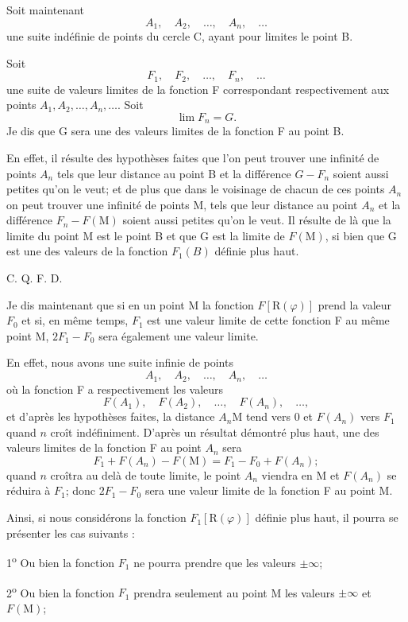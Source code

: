 \documentclass[11pt]{article}
\begin{document}
Soit maintenant
\[
A_1,
\quad A_2,
\quad \ldots,
\quad A_n,
\quad \ldots
\]
une suite indéfinie de points du cercle C, ayant pour limites le point B.

Soit
\[
F_1,
\quad F_2,
\quad \ldots,
\quad F_n,
\quad \ldots
\]
une suite de valeurs limites de la fonction F correspondant respectivement aux points $A_1,A_2,\ldots,A_n,\ldots$. Soit
\[
\lim F_n=G.
\]
Je dis que G sera une des valeurs limites de la fonction F au point B.

En effet, il résulte des hypothèses faites que l’on peut trouver une infinité de points $A_n$ tels que leur distance au point B et la différence $G-F_n$ soient aussi petites qu’on le veut; et de plus que dans le voisinage de chacun de ces points $A_n$ on peut trouver une infinité de points M, tels que leur distance au point $A_n$ et la différence $F_n-F(\mathrm{M})$ soient aussi petites qu’on le veut. Il résulte de là que la limite du point M est le point B et que G est la limite de $F(\mathrm{M})$, si bien que G est une des valeurs de la fonction $F_1(B)$ définie plus haut.
\begin{flushright}C. Q. F. D.\end{flushright}

Je dis maintenant que si en un point M la fonction $F[\mathrm{R}(\varphi)]$ prend la valeur $F_0$ et si, en même temps, $F_1$ est une valeur limite de cette fonction F au même point M, $2F_1-F_0$ sera également une valeur limite.

En effet, nous avons une suite infinie de points
\[
A_1,
\quad A_2,
\quad \ldots,
\quad A_n,
\quad \ldots
\]
où la fonction F a respectivement les valeurs
\[
F(A_1),
\quad F(A_2),
\quad \ldots,
\quad F(A_n),
\quad \ldots,
\]
et d’après les hypothèses faites, la distance $A_n\mathrm{M}$ tend vers 0 et $F(A_n)$ vers $F_1$ quand $n$ croît indéfiniment. D’après un résultat démontré plus haut, une des valeurs limites de la fonction F au point $A_n$ sera
\[
F_1+F(A_n)-F(\mathrm{M})=F_1-F_0+F(A_n);
\]
quand $n$ croîtra au delà de toute limite, le point $A_n$ viendra en M et $F(A_n)$ se réduira à $F_1$; donc $2F_1-F_0$ sera une valeur limite de la fonction F au point M.

Ainsi, si nous considérons la fonction $F_1[\mathrm{R}(\varphi)]$ définie plus haut, il pourra se présenter les cas suivants :

1\textsuperscript{o} Ou bien la fonction $F_1$ ne pourra prendre que les valeurs $\pm\infty$;

2\textsuperscript{o} Ou bien la fonction $F_1$ prendra seulement au point M les valeurs $\pm\infty$ et $F(\mathrm{M})$;
\end{document}
